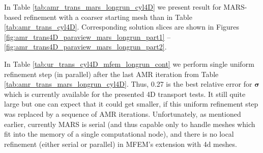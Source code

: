 \documentclass[a4paper,12pt]{amsart}
\numberwithin{equation}{section}
\renewcommand{\div}{\operatorname{div}}
\def\bsigma{{\boldsymbol \sigma}}
\begin{document}

In Table \ref{tab:amr_trans_mars_longrun_cyl4D} we present result for MARS-based refinement with a coarser starting mesh than in Table \ref{tab:amr_trans_cyl4D}. Corresponding solution slices are shown in Figures \ref{fig:amr_trans4D_paraview_mars_longrun_part1} -- \ref{fig:amr_trans4D_paraview_mars_longrun_part2}.

In Table \ref{tab:ur_trans_cyl4D_mfem_longrun_cont} we perform single uniform refinement step (in parallel) after the last AMR iteration from Table \ref{tab:amr_trans_mars_longrun_cyl4D}. Thus, 0.27 is the best relative error for $\bsigma$ which is currently available for the presented 4D transport tests. It still quite large but one can expect that it could get smaller, if this uniform refinement step was replaced by a sequence of AMR iterations. Unfortunately, as mentioned earlier, currently MARS is serial (and thus capable only to handle meshes which fit into the memory of a single computational node), and there is no local refinement (either serial or parallel) in MFEM's extension with 4d meshes.
\end{document}
